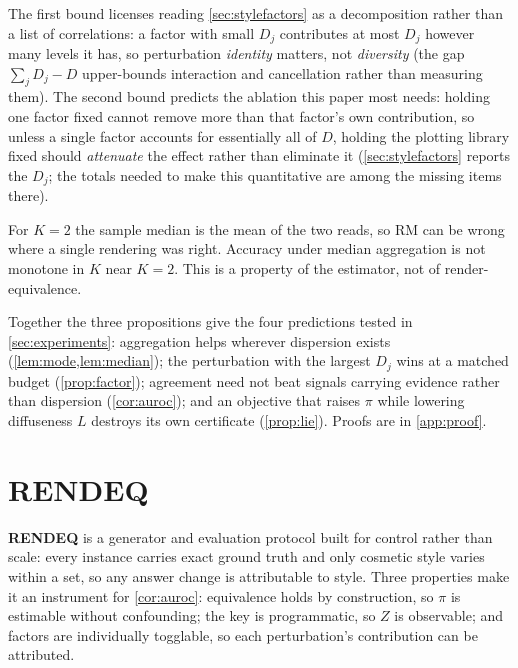 \documentclass[11pt]{article}
\newcommand{\rmg}{\mathrm{RM}}
\begin{document}
The first bound licenses reading \cref{sec:stylefactors} as a decomposition rather than a list of correlations: a factor with small $D_j$ contributes at most $D_j$ however many levels it has, so perturbation \emph{identity} matters, not \emph{diversity} (the gap $\sum_j D_j - D$ upper-bounds interaction and cancellation rather than measuring them). The second bound predicts the ablation this paper most needs: holding one factor fixed cannot remove more than that factor's own contribution, so unless a single factor accounts for essentially all of $D$, holding the plotting library fixed should \emph{attenuate} the effect rather than eliminate it (\cref{sec:stylefactors} reports the $D_j$; the totals needed to make this quantitative are among the missing items there).

\begin{remark}
\label{rem:k2}
For $K{=}2$ the sample median is the mean of the two reads, so $\rmg$ can be wrong where a single rendering was right. Accuracy under median aggregation is not monotone in $K$ near $K{=}2$. This is a property of the estimator, not of render-equivalence.
\end{remark}

Together the three propositions give the four predictions tested in \cref{sec:experiments}: aggregation helps wherever dispersion exists (\cref{lem:mode,lem:median}); the perturbation with the largest $D_j$ wins at a matched budget (\cref{prop:factor}); agreement need not beat signals carrying evidence rather than dispersion (\cref{cor:auroc}); and an objective that raises $\pi$ while lowering diffuseness $L$ destroys its own certificate (\cref{prop:lie}). Proofs are in \cref{app:proof}.

\section{RENDEQ}
\label{sec:benchmark}

\textbf{RENDEQ} is a generator and evaluation protocol built for control rather than scale: every instance carries exact ground truth and only cosmetic style varies within a set, so any answer change is attributable to style. Three properties make it an instrument for \cref{cor:auroc}: equivalence holds by construction, so $\pi$ is estimable without confounding; the key is programmatic, so $Z$ is observable; and factors are individually togglable, so each perturbation's contribution can be attributed.
\end{document}
